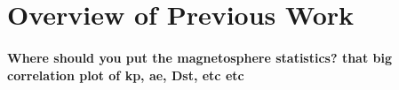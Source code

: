 \section{Overview of Previous Work}

\paragraph{Where should you put the magnetosphere statistics? that big correlation plot of kp, ae, Dst, etc etc}
